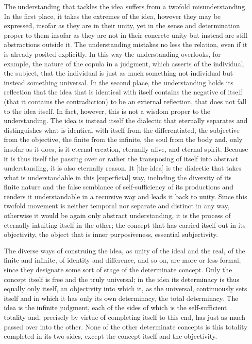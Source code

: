 The understanding that tackles the idea
suffers from a twofold misunderstanding.
In the first place, it takes the extremes of the idea,
however they may be expressed, insofar as they are in their unity,
yet in the sense and determination proper to them
insofar as they are not in their concrete unity
but instead are still abstractions outside it.
The understanding mistakes no less the relation,
even if it is already posited explicitly.
In this way the understanding overlooks, for example,
the nature of the copula in a judgment,
which asserts of the individual, the subject,
that the individual is just as much
something not individual
but instead something universal.
In the second place, the understanding
holds its reflection that
the idea that is identical with itself
contains the negative of itself
(that it contains the contradiction)
to be an external reflection,
that does not fall to the idea itself.
In fact, however, this is not a wisdom
proper to the understanding.
The idea is instead itself the dialectic that
eternally separates and distinguishes what is
identical with itself from the differentiated,
the subjective from the objective,
the finite from the infinite,
the soul from the body and,
only insofar as it does,
is it eternal creation,
eternally alive,
and eternal spirit.
Because it is thus itself the passing over
or rather the transposing of itself
into abstract understanding,
it is also eternally reason.
It [the idea] is the dialectic that
takes what is understandable in this [superficial] way,
including the diversity of its finite nature
and the false semblance of self-sufficiency of its productions
and renders it understandable in a recursive way
and leads it back to unity.
Since this twofold movement is
neither temporal nor separate and distinct in any way,
otherwise it would be again only abstract understanding,
it is the process of eternally intuiting itself in the other;
the concept that has carried itself out in its objectivity,
the object that is inner purposiveness, essential subjectivity.

The diverse ways of construing the idea,
as unity of the ideal and the real,
of the finite and infinite,
of identity and difference,
and so on, are more or less formal,
since they designate some sort of
stage of the determinate concept.
Only the concept itself is free and the truly universal;
in the idea its determinacy is thus equally only itself,
an objectivity into which it, as the universal,
continuously sets itself and in which it has only
its own determinacy, the total determinacy.
The idea is the infinite judgment,
each of the sides of which is
the self-sufficient totality and,
precisely by virtue of completing itself to this end,
has just as much passed over into the other.
None of the other determinate concepts is
this totality completed in its two sides,
except the concept itself and the objectivity.


